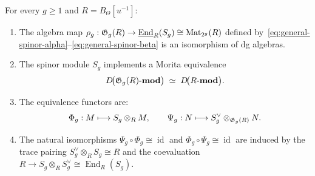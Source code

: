 \begin{theorem}
\label{thm:tholog-full-morita-g}
For every $g \geq 1$ and $R = B_\Theta[u^{-1}]$:
\begin{enumerate}[label=\textup{(\roman*)}]
\item The algebra map
 $\rho_g : \mathfrak{G}_g(R) \to \underline{\operatorname{End}}_R(S_g)
 \cong \operatorname{Mat}_{2^g}(R)$
 defined by~\eqref{eq:general-spinor-alpha}--\eqref{eq:general-spinor-beta}
 is an isomorphism of dg algebras.
\item The spinor module $S_g$ implements a Morita equivalence
 \[
 D\!\bigl(\mathfrak{G}_g(R)\text{-}\mathbf{mod}\bigr)
 \;\simeq\;
 D\!\bigl(R\text{-}\mathbf{mod}\bigr).
 \]
\item The equivalence functors are:
 \[
 \Phi_g : M \longmapsto S_g \otimes_R M,\qquad
 \Psi_g : N \longmapsto S_g^\vee \otimes_{\mathfrak{G}_g(R)} N.
 \]
\item The natural isomorphisms
 $\Psi_g \circ \Phi_g \cong \operatorname{id}$
 and $\Phi_g \circ \Psi_g \cong \operatorname{id}$
 are induced by the trace pairing
 $S_g^\vee \otimes_R S_g \cong R$
 and the coevaluation
 $R \to S_g \otimes_R S_g^\vee \cong \operatorname{End}_R(S_g)$.
\end{enumerate}
\end{theorem}

